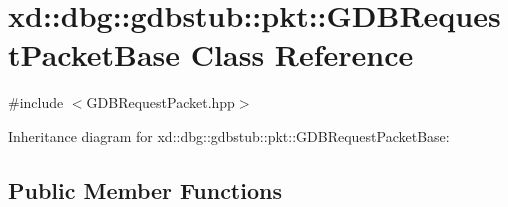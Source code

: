 \hypertarget{classxd_1_1dbg_1_1gdbstub_1_1pkt_1_1_g_d_b_request_packet_base}{}\section{xd\+:\+:dbg\+:\+:gdbstub\+:\+:pkt\+:\+:G\+D\+B\+Request\+Packet\+Base Class Reference}
\label{classxd_1_1dbg_1_1gdbstub_1_1pkt_1_1_g_d_b_request_packet_base}


{\ttfamily \#include $<$G\+D\+B\+Request\+Packet.\+hpp$>$}



Inheritance diagram for xd\+:\+:dbg\+:\+:gdbstub\+:\+:pkt\+:\+:G\+D\+B\+Request\+Packet\+Base\+:
\subsection*{Public Member Functions}
